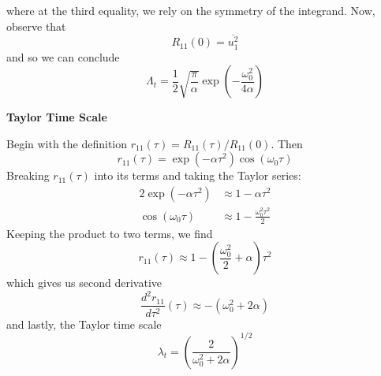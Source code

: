 \documentclass[a4paper]{article}
\begin{document}
where at the third equality, we rely on the symmetry of the integrand. Now, observe that
\[
	R_{11} \!\left( 0 \right) = \overline{u^{2}_{1}}
\]
and so we can conclude
\[
	\boxed{ \Lambda_{t} = \frac{1}{2} \sqrt{\frac{\pi }{\alpha }} \exp\left( -\frac{\omega^{2}_{0}}{4 \alpha } \right) }
\]

\textbf{Taylor Time Scale}

Begin with the definition \(r_{11} \!\left( \tau  \right) = R_{11}\!\left( \tau  \right) / R_{11}\!\left( 0 \right) \). Then
\[
	r_{11} \!\left( \tau  \right) = \exp\left( -\alpha \tau^{2} \right) \cos\left( \omega_{0} \tau  \right)
\]
Breaking \(r_{11}\!\left( \tau  \right) \) into its terms and taking the Taylor series:
\begin{alignat*}{2}
	\exp\left( -\alpha \tau^{2} \right) & \approx 1 - \alpha \tau^{2} \\
	\cos\left( \omega_{0}\tau  \right) & \approx 1 - \frac{\omega^{2}_{0} \tau^{2}}{2}
\end{alignat*}
Keeping the product to two terms, we find
\[
	r_{11} \!\left( \tau  \right) \approx 1 - \!\left( \frac{\omega^{2}_{0}}{2} + \alpha  \right) \tau^{2} 
\]
which gives us second derivative
\[
	\frac{d^{2} r_{11} }{d \tau^{2}} \!\left( \tau \right)  \approx - \!\left( \omega^{2}_{0} + 2 \alpha  \right) 
\]
and lastly, the Taylor time scale
\[
	\boxed{\lambda_{t} = \!\left( \frac{2}{\omega^{2}_{0} + 2 \alpha } \right)^{1/2}}
\]
\end{document}
